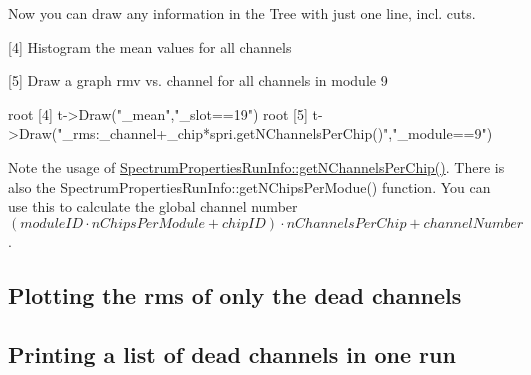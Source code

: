 Now you can draw any information in the Tree with just one line, incl. cuts. \begin{DoxyItemize}
\item \mbox{[}4\mbox{]} Histogram the mean values for all channels \item \mbox{[}5\mbox{]} Draw a graph rmv vs. channel for all channels in module 9 
\begin{DoxyCode}
root [4] t->Draw("_mean","_slot==19")
root [5] t->Draw("_rms:_channel+_chip*spri.getNChannelsPerChip()","_module==9") 
\end{DoxyCode}
 Note the usage of \hyperlink{class_spectrum_properties_run_info_a3d9d8e0ae2cef40794561409120e257c}{SpectrumPropertiesRunInfo::getNChannelsPerChip()}. There is also the SpectrumPropertiesRunInfo::getNChipsPerModue() function. You can use this to calculate the global channel number $( moduleID \cdot nChipsPerModule + chipID ) \cdot nChannelsPerChip + channelNumber $.\end{DoxyItemize}
\hypertarget{examples_plotDead}{}\subsection{Plotting the rms of only the dead channels}\label{examples_plotDead}
\hypertarget{examples_printDead}{}\subsection{Printing a list of dead channels in one run}\label{examples_printDead}
